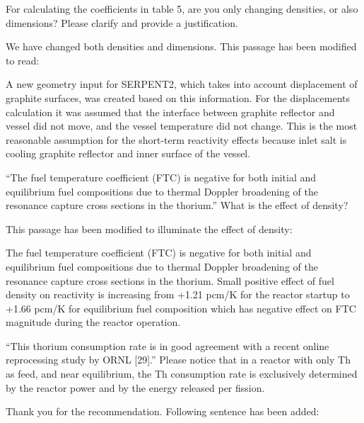 \documentclass[answers,11pt]{exam}
\begin{document}
\begin{questions}

        \question For calculating the coefficients in table 5, are you only 
        changing densities, or also dimensions? Please clarify and provide a 
        justification.  
        \begin{solution}
        		We have changed both densities and dimensions. This passage 
        		has been modified to read:
        		
                A new geometry input for SERPENT2, which takes into account 
                displacement of graphite surfaces, was created based on this information. 
                For the displacements calculation it was assumed that the interface 
                between graphite reflector and vessel did not move, and the vessel 
                temperature did not change. This is the most reasonable assumption for 
				the short-term reactivity effects because inlet salt is cooling graphite 
				reflector and inner surface of the vessel.
        \end{solution}


        \question ``The fuel temperature coefficient (FTC) is negative for both 
        initial and equilibrium fuel compositions due to thermal Doppler 
        broadening of the resonance capture cross sections in the thorium.'' 
        What is the effect of density?
        \begin{solution}
                This passage has been modified to illuminate the effect of density:
                
				The fuel temperature coefficient (FTC) is negative for both initial and 
				equilibrium fuel compositions due to thermal Doppler broadening of the 
				resonance capture cross sections in the thorium. Small positive effect 
				of fuel density on reactivity is increasing from +1.21 pcm/K for the 
				reactor startup to +1.66 pcm/K for equilibrium fuel composition which 
				has negative effect on FTC magnitude during the reactor operation. 
        \end{solution}


        \question ``This thorium consumption rate is in good agreement with a 
        recent online reprocessing study by ORNL [29].'' Please notice that in a 
        reactor with only Th as feed, and near equilibrium, the Th consumption 
        rate is  exclusively determined by the reactor power and by the energy 
        released per fission.  
        \begin{solution}
                Thank you for the recommendation. Following sentence has been 
                added:
                

\end{solution}
\end{questions}
\end{document}
